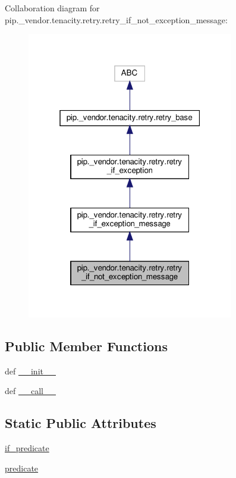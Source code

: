 Collaboration diagram for pip.\+\_\+vendor.\+tenacity.\+retry.\+retry\+\_\+if\+\_\+not\+\_\+exception\+\_\+message\+:
\nopagebreak
\begin{figure}[H]
\begin{center}
\leavevmode
\includegraphics[width=256pt]{classpip_1_1__vendor_1_1tenacity_1_1retry_1_1retry__if__not__exception__message__coll__graph}
\end{center}
\end{figure}
\subsection*{Public Member Functions}
\begin{DoxyCompactItemize}
\item 
def \hyperlink{classpip_1_1__vendor_1_1tenacity_1_1retry_1_1retry__if__not__exception__message_a68244b7b00b197889ed5a34a0ffb0fec}{\+\_\+\+\_\+init\+\_\+\+\_\+}
\item 
def \hyperlink{classpip_1_1__vendor_1_1tenacity_1_1retry_1_1retry__if__not__exception__message_a74fb22a4892037b1c3e0a6ebbe99c8b6}{\+\_\+\+\_\+call\+\_\+\+\_\+}
\end{DoxyCompactItemize}
\subsection*{Static Public Attributes}
\begin{DoxyCompactItemize}
\item 
\hyperlink{classpip_1_1__vendor_1_1tenacity_1_1retry_1_1retry__if__not__exception__message_ab44513627c403e2c230fe259ea1268d5}{if\+\_\+predicate}
\item 
\hyperlink{classpip_1_1__vendor_1_1tenacity_1_1retry_1_1retry__if__not__exception__message_aa54e0ca49f4d7976f2572cdbe6fc5605}{predicate}
\end{DoxyCompactItemize}
